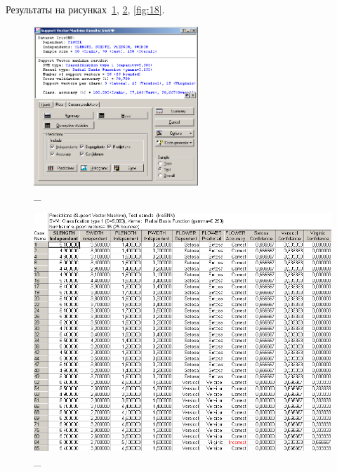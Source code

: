 Результаты на рисунках~\ref{fig:16}, \ref{fig:17}, \ref{fig:18}.

\begin{figure}[!h]
  \centering

  \includegraphics[height=6cm]
  {inc/ex_16.PNG}

  \caption{\_}

  \label{fig:16}
\end{figure}

\begin{figure}[!hp]
  \centering

  \includegraphics[width=14cm]
  {inc/ex_17.PNG}

  \caption{\_}

  \label{fig:17}
\end{figure}

